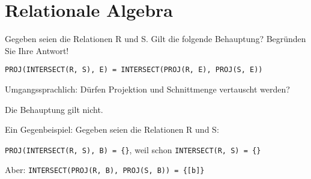 \section{Relationale Algebra}

Gegeben seien die Relationen R und S. Gilt die folgende Behauptung? Begründen Sie Ihre Antwort!

\texttt{PROJ(INTERSECT(R, S), E) = \beamertxt{\\ \hspace*{3em} =} INTERSECT(PROJ(R, E), PROJ(S, E))}

Umgangssprachlich: Dürfen Projektion und Schnittmenge vertauscht werden?

\begin{solution}
Die Behauptung gilt nicht.

Ein Gegenbeispiel: Gegeben seien die Relationen R und S:
\begin{center}
\end{center}

\texttt{PROJ(INTERSECT(R, S), B) = \{\}}, weil schon \texttt{INTERSECT(R, S) = \{\} }

Aber:
\texttt{INTERSECT(PROJ(R, B), PROJ(S, B)) = \{[b]\} }
\end{solution}

